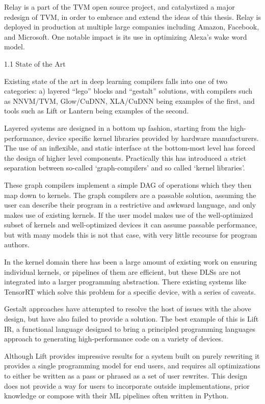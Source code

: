 Relay is a part of the TVM open source project, and catalystized a major redesign of TVM, in order to embrace and extend the ideas of this thesis. Relay is deployed in production at multiple large companies including Amazon, Facebook, and Microsoft. One notable impact is its use in optimizing Alexa’s wake word model.

1.1 State of the Art

Existing state of the art in deep learning compilers falls into one of two categories: a) layered “lego” blocks and “gestalt” solutions, with compilers such as NNVM/TVM, Glow/CuDNN, XLA/CuDNN being examples of the first, and tools such as Lift or Lantern being examples of the second.

Layered systems are designed in a bottom up fashion, starting from the high-performance, device specific kernel libraries provided by hardware manufacturers. The use of an inflexible, and static interface at the bottom-most level has forced the design of higher level components. Practically this has introduced a strict separation between so-called ‘graph-compilers’ and so called ‘kernel libraries’.

These graph compilers implement a simple DAG of operations which they then map down to kernels. The graph compilers are a passable solution, assuming the user can describe their program in a restrictive and awkward language, and only makes use of existing kernels. If the user model makes use of the well-optimized subset of kernels and well-optimized devices it can assume passable performance, but with many models this is not that case, with very little recourse for program authors.

In the kernel domain there has been a large amount of existing work on ensuring individual kernels, or pipelines of them are efficient, but these DLSs are not integrated into a larger programming abstraction. There existing systems like TensorRT which solve this problem for a specific device, with a series of caveats.

Gestalt approaches have attempted to resolve the host of issues with the above design, but have also failed to provide a solution. The best example of this is Lift IR, a functional language designed to bring a principled programming languages approach to generating high-performance code on a variety of devices.

Although Lift provides impressive results for a system built on purely rewriting it provides a single programming model for end users, and requires all optimizations to either be written as a pass or phrased as a set of user rewrites. This design does not provide a way for users to incorporate outside implementations, prior knowledge or compose with their ML pipelines often written in Python.

